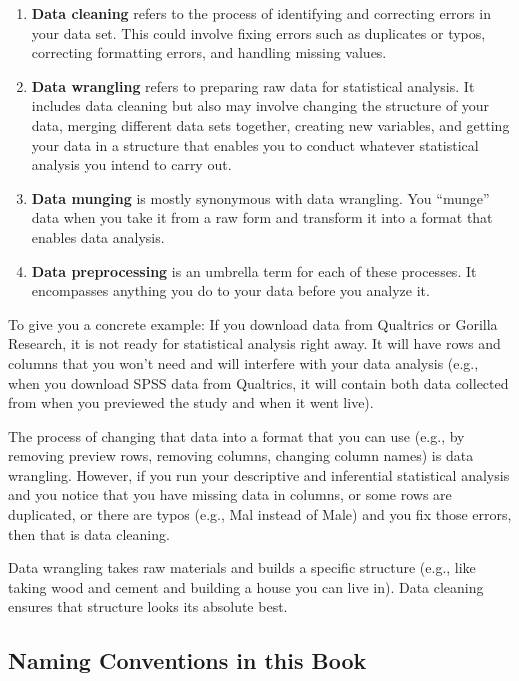 \documentclass[
]{book}
\begin{document}
\begin{enumerate}
\def\labelenumi{\arabic{enumi}.}
\item
  \textbf{Data cleaning} refers to the process of identifying and correcting errors in your data set. This could involve fixing errors such as duplicates or typos, correcting formatting errors, and handling missing values.
\item
  \textbf{Data wrangling} refers to preparing raw data for statistical analysis. It includes data cleaning but also may involve changing the structure of your data, merging different data sets together, creating new variables, and getting your data in a structure that enables you to conduct whatever statistical analysis you intend to carry out.
\item
  \textbf{Data munging} is mostly synonymous with data wrangling. You ``munge'' data when you take it from a raw form and transform it into a format that enables data analysis.
\item
  \textbf{Data preprocessing} is an umbrella term for each of these processes. It encompasses anything you do to your data before you analyze it.
\end{enumerate}

To give you a concrete example: If you download data from Qualtrics or Gorilla Research, it is not ready for statistical analysis right away. It will have rows and columns that you won't need and will interfere with your data analysis (e.g., when you download SPSS data from Qualtrics, it will contain both data collected from when you previewed the study and when it went live).

The process of changing that data into a format that you can use (e.g., by removing preview rows, removing columns, changing column names) is data wrangling. However, if you run your descriptive and inferential statistical analysis and you notice that you have missing data in columns, or some rows are duplicated, or there are typos (e.g., Mal instead of Male) and you fix those errors, then that is data cleaning.

Data wrangling takes raw materials and builds a specific structure (e.g., like taking wood and cement and building a house you can live in). Data cleaning ensures that structure looks its absolute best.

\hypertarget{naming-conventions-in-this-book}{%
\subsection{\texorpdfstring{\textbf{Naming Conventions in this Book}}{Naming Conventions in this Book}}\label{naming-conventions-in-this-book}}
\end{document}
